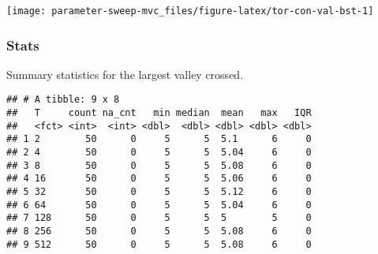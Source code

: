 \documentclass[]{book}
\newenvironment{Shaded}{\begin{snugshade}}{\end{snugshade}}
\newcommand{\DataTypeTok}[1]{\textcolor[rgb]{0.13,0.29,0.53}{#1}}
\newcommand{\KeywordTok}[1]{\textcolor[rgb]{0.13,0.29,0.53}{\textbf{#1}}}
\newcommand{\NormalTok}[1]{#1}
\newcommand{\OperatorTok}[1]{\textcolor[rgb]{0.81,0.36,0.00}{\textbf{#1}}}
\newcommand{\OtherTok}[1]{\textcolor[rgb]{0.56,0.35,0.01}{#1}}
\newcommand{\StringTok}[1]{\textcolor[rgb]{0.31,0.60,0.02}{#1}}
\begin{document}
\texttt{[image: parameter-sweep-mvc\_files/figure-latex/tor-con-val-bst-1]}

\hypertarget{stats-16}{%
\subsubsection{Stats}\label{stats-16}}

Summary statistics for the largest valley crossed.

\begin{Shaded}
\end{Shaded}

\begin{verbatim}
## # A tibble: 9 x 8
##   T     count na_cnt   min median  mean   max   IQR
##   <fct> <int>  <int> <dbl>  <dbl> <dbl> <dbl> <dbl>
## 1 2        50      0     5      5  5.1      6     0
## 2 4        50      0     5      5  5.04     6     0
## 3 8        50      0     5      5  5.08     6     0
## 4 16       50      0     5      5  5.06     6     0
## 5 32       50      0     5      5  5.12     6     0
## 6 64       50      0     5      5  5.04     6     0
## 7 128      50      0     5      5  5        5     0
## 8 256      50      0     5      5  5.08     6     0
## 9 512      50      0     5      5  5.08     6     0
\end{verbatim}
\end{document}
